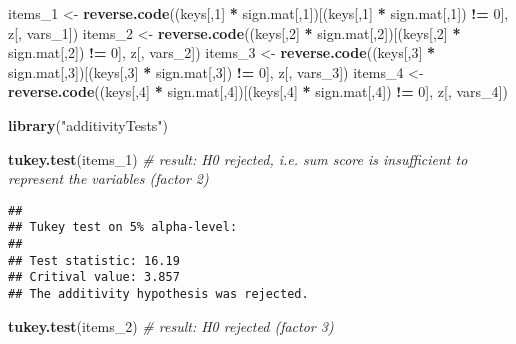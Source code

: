 \documentclass[
]{article}
\newenvironment{Shaded}{\begin{snugshade}}{\end{snugshade}}
\newcommand{\CommentTok}[1]{\textcolor[rgb]{0.56,0.35,0.01}{\textit{#1}}}
\newcommand{\DecValTok}[1]{\textcolor[rgb]{0.00,0.00,0.81}{#1}}
\newcommand{\KeywordTok}[1]{\textcolor[rgb]{0.13,0.29,0.53}{\textbf{#1}}}
\newcommand{\NormalTok}[1]{#1}
\newcommand{\OperatorTok}[1]{\textcolor[rgb]{0.81,0.36,0.00}{\textbf{#1}}}
\newcommand{\StringTok}[1]{\textcolor[rgb]{0.31,0.60,0.02}{#1}}
\begin{document}
\begin{Shaded}
\begin{Highlighting}[]
\NormalTok{items_}\DecValTok{1}\NormalTok{ <-}\StringTok{ }\KeywordTok{reverse.code}\NormalTok{((keys[,}\DecValTok{1}\NormalTok{] }\OperatorTok{*}\StringTok{ }\NormalTok{sign.mat[,}\DecValTok{1}\NormalTok{])[(keys[,}\DecValTok{1}\NormalTok{] }\OperatorTok{*}\StringTok{ }\NormalTok{sign.mat[,}\DecValTok{1}\NormalTok{]) }\OperatorTok{!=}\StringTok{ }\DecValTok{0}\NormalTok{], z[, vars_}\DecValTok{1}\NormalTok{])}
\NormalTok{items_}\DecValTok{2}\NormalTok{ <-}\StringTok{ }\KeywordTok{reverse.code}\NormalTok{((keys[,}\DecValTok{2}\NormalTok{] }\OperatorTok{*}\StringTok{ }\NormalTok{sign.mat[,}\DecValTok{2}\NormalTok{])[(keys[,}\DecValTok{2}\NormalTok{] }\OperatorTok{*}\StringTok{ }\NormalTok{sign.mat[,}\DecValTok{2}\NormalTok{]) }\OperatorTok{!=}\StringTok{ }\DecValTok{0}\NormalTok{], z[, vars_}\DecValTok{2}\NormalTok{])}
\NormalTok{items_}\DecValTok{3}\NormalTok{ <-}\StringTok{ }\KeywordTok{reverse.code}\NormalTok{((keys[,}\DecValTok{3}\NormalTok{] }\OperatorTok{*}\StringTok{ }\NormalTok{sign.mat[,}\DecValTok{3}\NormalTok{])[(keys[,}\DecValTok{3}\NormalTok{] }\OperatorTok{*}\StringTok{ }\NormalTok{sign.mat[,}\DecValTok{3}\NormalTok{]) }\OperatorTok{!=}\StringTok{ }\DecValTok{0}\NormalTok{], z[, vars_}\DecValTok{3}\NormalTok{])}
\NormalTok{items_}\DecValTok{4}\NormalTok{ <-}\StringTok{ }\KeywordTok{reverse.code}\NormalTok{((keys[,}\DecValTok{4}\NormalTok{] }\OperatorTok{*}\StringTok{ }\NormalTok{sign.mat[,}\DecValTok{4}\NormalTok{])[(keys[,}\DecValTok{4}\NormalTok{] }\OperatorTok{*}\StringTok{ }\NormalTok{sign.mat[,}\DecValTok{4}\NormalTok{]) }\OperatorTok{!=}\StringTok{ }\DecValTok{0}\NormalTok{], z[, vars_}\DecValTok{4}\NormalTok{])}

\KeywordTok{library}\NormalTok{(}\StringTok{"additivityTests"}\NormalTok{)}

\KeywordTok{tukey.test}\NormalTok{(items_}\DecValTok{1}\NormalTok{) }\CommentTok{# result: H0 rejected, i.e. sum score is insufficient to represent the variables (factor 2)}
\end{Highlighting}
\end{Shaded}

\begin{verbatim}
## 
## Tukey test on 5% alpha-level:
## 
## Test statistic: 16.19 
## Critival value: 3.857 
## The additivity hypothesis was rejected.
\end{verbatim}

\begin{Shaded}
\begin{Highlighting}[]
\KeywordTok{tukey.test}\NormalTok{(items_}\DecValTok{2}\NormalTok{) }\CommentTok{# result: H0 rejected (factor 3)}
\end{Highlighting}
\end{Shaded}
\end{document}
